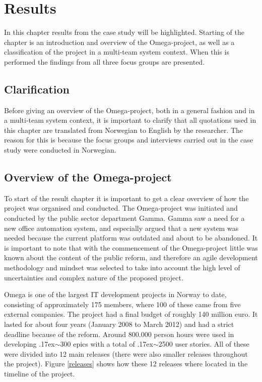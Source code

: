 \chapter{Results}
\label{results}

\minitoc

In this chapter results from the case study will be highlighted. Starting of the chapter is an introduction and overview of the Omega-project, as well as a classification of the project in a multi-team system context. When this is performed the findings from all three focus groups are presented.


\newpage

\section{Clarification}

Before giving an overview of the Omega-project, both in a general fashion and in a multi-team system context, it is important to clarify that all quotations used in this chapter are translated from Norwegian to English by the researcher. The reason for this is because the focus groups and interviews carried out in the case study were conducted in Norwegian.

\section{Overview of the Omega-project}

To start of the result chapter it is important to get a clear overview of how the project was organised and conducted. The Omega-project was initiated and conducted by the public sector department Gamma. Gamma saw a need for a new office automation system, and especially argued that a new system was needed because the current platform was outdated and about to be abandoned. It is important to note that with the commencement of the Omega-project little was known about the content of the public reform, and therefore an agile development methodology and mindset was selected to take into account the high level of uncertainties and complex nature of the proposed project.

Omega is one of the largest IT development projects in Norway to date, consisting of approximately 175 members, where 100 of these came from five external companies. The project had a final budget of roughly 140 million euro. It lasted for about four years (January 2008 to March 2012) and had a strict deadline because of the reform. Around 800.000 person hours were used in developing {\raise.17ex\hbox{$\scriptstyle\mathtt{\sim}$}}300 epics with a total of {\raise.17ex\hbox{$\scriptstyle\mathtt{\sim}$}}2500 user stories. All of these were divided into 12 main releases (there were also smaller releases throughout the project). Figure \ref{releases} shows how these 12 releases where located in the timeline of the project.

